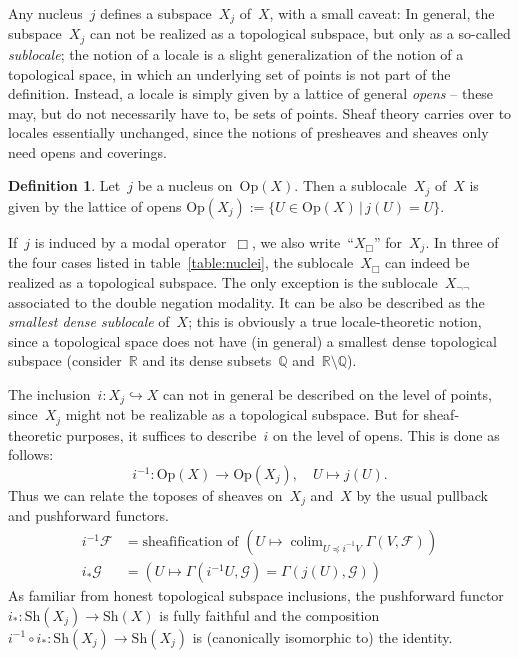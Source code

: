 \documentclass[10pt]{amsart}
\theoremstyle{definition}
\newtheorem{defn}{Definition}[section]
\theoremstyle{plain}
\theoremstyle{remark}
\newcommand{\F}{\mathcal{F}}
\newcommand{\G}{\mathcal{G}}
\newcommand{\RR}{\mathbb{R}}
\newcommand{\QQ}{\mathbb{Q}}
\newcommand{\Sh}{\mathrm{Sh}}
\DeclareMathOperator{\colim}{colim}
\newcommand{\Open}{\mathrm{Op}}
\newcommand{\?}{\,{:}\,}
\renewcommand{\_}{\mathpunct{.}\,}
\newcommand{\lra}{\longrightarrow}
\begin{document}
Any nucleus~$j$ defines a subspace~$X_j$ of~$X$, with a small caveat: In
general, the subspace~$X_j$ can not be realized as a topological subspace, but
only as a so-called \emph{sublocale}; the notion of a locale is a slight
generalization of the notion of a topological space, in which an underlying set
of points is not part of the definition. Instead, a locale is simply given by a
lattice of general \emph{opens} -- these may, but do not necessarily have to,
be sets of points. Sheaf theory carries over to locales essentially unchanged,
since the notions of presheaves and sheaves only need opens and coverings.

\begin{defn}\label{defn:subspace-by-nucleus}Let~$j$ be a nucleus on~$\Open(X)$.
Then a sublocale~$X_j$ of~$X$ is given by the lattice of opens
$\Open(X_j) := \{ U \in \Open(X) \,|\, j(U) = U \}$.
\end{defn}
If~$j$ is induced by a modal operator~$\Box$, we also write~``$X_\Box$''
for~$X_j$. In three of the four cases listed in table~\ref{table:nuclei}, the
sublocale~$X_\Box$ can indeed be realized as a topological subspace. The only
exception is the sublocale~$X_{\neg\neg}$ associated to the double negation
modality. It can be also be described as the \emph{smallest dense sublocale}
of~$X$; this is obviously a true locale-theoretic notion, since a topological
space does not have (in general) a smallest dense topological subspace
(consider~$\RR$ and its dense subsets~$\QQ$ and~$\RR \setminus \QQ$).

The inclusion~$i : X_j \hookrightarrow X$ can not in general be described on the
level of points, since~$X_j$ might not be realizable as a topological subspace.
But for sheaf-theoretic purposes, it suffices to describe~$i$ on the level of
opens. This is done as follows:
\[ i^{-1} : \Open(X) \lra \Open(X_j), \quad U \longmapsto j(U). \]
Thus we can relate the toposes of sheaves on~$X_j$ and~$X$ by the usual
pullback and pushforward functors.
\begin{align*}
  i^{-1} \F &= \text{sheafification of $(U \mapsto \colim_{U \preceq i^{-1}V} \Gamma(V,\F))$} \\
  i_* \G &= (U \mapsto \Gamma(i^{-1}U, \G) = \Gamma(j(U), \G))
\end{align*}
As familiar from honest topological subspace inclusions, the pushforward
functor~$i_* : \Sh(X_j) \to \Sh(X)$ is fully faithful and the composition~$i^{-1}
\circ i_* : \Sh(X_j) \to \Sh(X_j)$ is (canonically isomorphic to) the identity.
\end{document}
